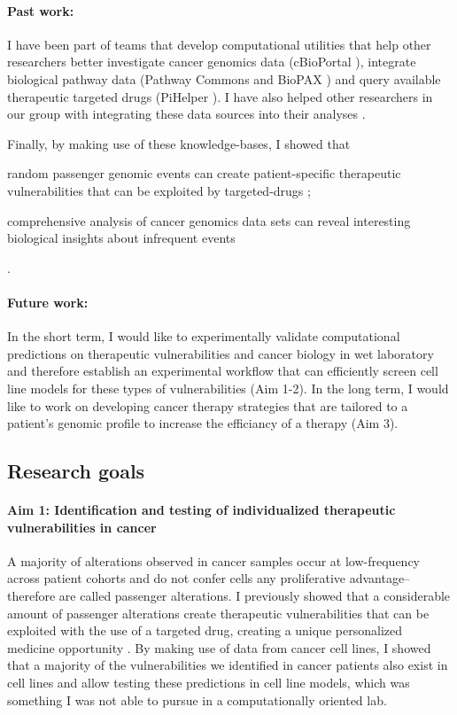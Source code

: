 \documentclass[11pt,letterpaper]{article}
\begin{document}
\paragraph{Past work: }I have been part of teams that develop computational utilities that help other researchers better 
investigate cancer genomics data (cBioPortal \cite{gao2014cbioportal, cerami2012cbio}),
integrate biological pathway data (Pathway Commons and BioPAX \cite{demir2013using,babur2014integrating})
and query available therapeutic targeted drugs (PiHelper \cite{aksoy2013pihelper}).
I have also helped other researchers in our group with integrating these data sources into their analyses \cite{ciriello2013emerging,korkut2014perturbation,babur2014systematic}.

Finally, by making use of these knowledge-bases, 
I showed that 
\begin{inparaenum}[(i)]
 \item random passenger genomic events can create patient-specific therapeutic vulnerabilities that can be exploited by targeted-drugs \cite{aksoy2014prediction};
 \item comprehensive analysis of cancer genomics data sets can reveal interesting biological insights about infrequent events \cite{aksoy2014cancer}
\end{inparaenum}.

\paragraph{Future work:} 
In the short term, I would like to experimentally validate computational predictions on therapeutic vulnerabilities and cancer biology in wet laboratory
and therefore establish an experimental workflow that can efficiently screen cell line models for these types of vulnerabilities (Aim 1-2).
In the long term, I would like to work on developing cancer therapy strategies that are tailored to a patient's genomic profile to increase the efficiancy of a therapy (Aim 3).

\subsection*{Research goals}
\paragraph{Aim 1: Identification and testing of individualized therapeutic vulnerabilities in cancer}
A majority of alterations observed in cancer samples occur at low-frequency across patient cohorts
and do not confer cells any proliferative advantage--therefore are called passenger alterations.
I previously showed that a considerable amount of passenger alterations create therapeutic vulnerabilities that can be exploited with the use of a targeted drug, creating a unique personalized medicine opportunity \cite{aksoy2014prediction}.
By making use of data from cancer cell lines,
I showed that a majority of the vulnerabilities we identified in cancer patients also exist in cell lines
and allow testing these predictions in cell line models, which was something I was not able to pursue in a computationally oriented lab.
\end{document}
